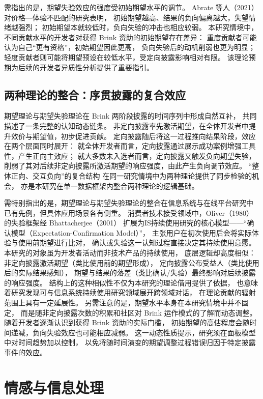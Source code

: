 \documentclass[
    type = master, %
    degree = professional,        %
    decl-page,  %
    twoside,                %
    fontset = fandol %
  ]{njuthesis}
\begin{document}
需指出的是，期望失验效应的强度受初始期望水平的调节。
Abrate 等人（2021）对价格—体验不匹配的研究表明，
初始期望越高、结果的负向偏离越大，失望情绪越强烈；
初始期望本就较低时，负向失验的冲击也相应较弱\cite{abrate2021relationship}。
本研究情境中，不同贡献水平的开发者对获得 Brink 资助的初始期望存在差异：
重度贡献者可能认为自己“更有资格”，初始期望因此更高，
负向失验后的动机削弱也更为明显；
轻度贡献者则可能将期望预设在较低水平，受定向披露影响相对有限。
该理论预期为后续的开发者异质性分析提供了重要指引。

\subsection{两种理论的整合：序贯披露的复合效应}

期望理论与期望失验理论在 Brink 两阶段披露的时间序列中形成自然互补，
共同描述了一条完整的认知动态链条。
非定向披露率先激活期望，在全体开发者中提升效价与期望值，初步促进贡献。
定向披露随后将这一过程推向结果阶段，效应在两个层面同时展开：
就全体开发者而言，定向披露通过展示成功案例增强工具性，产生正向主效应；
就大多数未入选者而言，定向披露又触发负向期望失验，
削弱了其对后续非定向披露所激活期望的响应强度，由此产生负向调节效应。
“整体正向、交互负向”的复合结构
在同一研究情境中为两种理论提供了同步检验的机会，
亦是本研究在单一数据框架内整合两种理论的逻辑基础。

需特别指出的是，期望理论与期望失验理论的整合在信息系统与在线平台研究中
已有先例，但具体应用场景各有侧重。
消费者技术接受领域中，Oliver（1980）的失验框架经 Bhattacherjee（2001）\cite{bhattacherjee2001understanding}
扩展为IS持续使用研究的核心模型——“确认模型（Expectation-Confirmation Model）”，
主张用户在初次使用后会将实际体验与使用前期望进行比对，
确认或失验这一认知过程直接决定其持续使用意愿。
本研究的对象虽为开发者活动而非技术产品的持续使用，
底层逻辑却高度相似：非定向披露激活期望（类比使用前的期望形成），
定向披露公布受益人（类比使用后的实际结果感知），
期望与结果的落差（类比确认/失验）最终影响对后续披露的响应强度。
结构上的这种相似性不仅为本研究的理论借用提供了依据，
也意味着研究发现可与信息系统持续使用研究领域展开跨领域对话，
在理论贡献的辐射范围上具有一定延展性。
另需注意的是，期望水平本身在本研究情境中并不固定，
而是随非定向披露次数的积累和社区对 Brink 运作模式的了解而动态调整。
随着开发者逐渐认识到获得 Brink 资助的实际门槛，
初始期望的高估程度会随时间递减，负向失验效应也可能相应减弱。
这一动态性质提示，研究须在面板模型中对时间趋势加以控制，
以免将随时间演变的期望调整过程错误归因于特定披露事件的效应。

\section{情感与信息处理}
\end{document}
